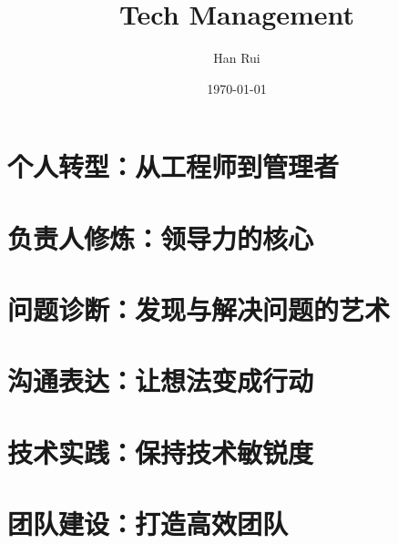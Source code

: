 \documentclass[openany,10pt,UTF8]{ctexbook}
\title{Tech Management}
\author{Han Rui}
\date{\today}
\begin{document}
\maketitle
\tableofcontents

\part{个人转型：从工程师到管理者}

\part{负责人修炼：领导力的核心}

\part{问题诊断：发现与解决问题的艺术}

\part{沟通表达：让想法变成行动}

\part{技术实践：保持技术敏锐度}

\part{团队建设：打造高效团队}
\end{document}
